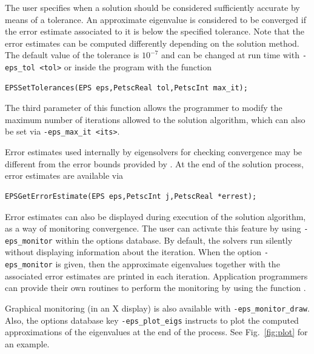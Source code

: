 The user specifies when a solution should be considered sufficiently accurate by means of a tolerance. An approximate eigenvalue is considered to be converged if the error estimate associated to it is below the specified tolerance. Note that the error estimates can be computed differently depending on the solution method. The default value of the tolerance is $10^{-7}$ and can be changed at run time with \Verb!-eps_tol <tol>! or inside the program with the function
	\begin{Verbatim}[fontsize=\small]
	EPSSetTolerances(EPS eps,PetscReal tol,PetscInt max_it);
	\end{Verbatim}
	The third parameter of this function allows the programmer to modify the maximum number of iterations allowed to the solution algorithm, which can also be set via \Verb!-eps_max_it <its>!.

	Error estimates used internally by eigensolvers for checking convergence may be different from the error bounds provided by . At the end of the solution process, error estimates are available via
	\begin{Verbatim}[fontsize=\small]
	EPSGetErrorEstimate(EPS eps,PetscInt j,PetscReal *errest);
	\end{Verbatim}

	Error estimates can also be displayed during execution of the solution algorithm, as a way of monitoring convergence. The user can activate this feature by using \Verb!-eps_monitor! within the options database. By default, the solvers run silently without displaying information about the iteration. When the option \Verb!-eps_monitor! is given, then the approximate eigenvalues together with the associated error estimates are printed in each iteration. Application programmers can provide their own routines to perform the monitoring by using the function .

	Graphical monitoring (in an X display) is also available with \Verb!-eps_monitor_draw!. Also, the options database key \Verb!-eps_plot_eigs! instructs \slepc to plot the computed approximations of the eigenvalues at the end of the process. See Fig.~\ref{fig:plot} for an example.

